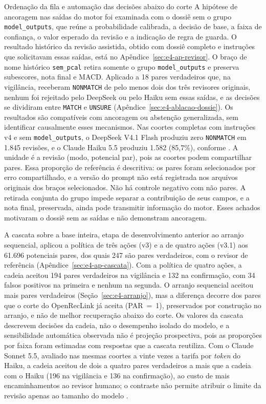 \begin{chapter}{Ordenação da fila e automação das decisões abaixo do corte}
A hipótese de ancoragem nas saídas do motor foi examinada com o dossiê sem o grupo \texttt{model\_outputs}, que reúne a probabilidade calibrada, a decisão de base, a faixa de confiança, o valor esperado da revisão e a indicação de regra de guarda. O resultado histórico da revisão assistida, obtido com dossiê completo e instruções que solicitavam essas saídas, está no Apêndice~\ref{sec:e4-ap-revisor}. O braço de nome histórico \texttt{sem\_pcal} retira somente o grupo \texttt{model\_outputs} e preserva subescores, nota final e MACD. Aplicado a 18 pares verdadeiros que, na vigilância, receberam \texttt{NONMATCH} de pelo menos dois dos três revisores originais, nenhum foi rejeitado pelo DeepSeek ou pelo Haiku sem essas saídas, e as decisões se dividiram entre \texttt{MATCH} e \texttt{UNSURE} (Apêndice~\ref{sec:e4-ablacao-dossie}). Os resultados são compatíveis com ancoragem ou abstenção generalizada, sem identificar causalmente esses mecanismos. Nas coortes completas com instruções v4 e sem \texttt{model\_outputs}, o DeepSeek V4.1 Flash produziu zero \texttt{NONMATCH} em 1.845 revisões, e o Claude Haiku 5.5 produziu 1.582 (85,7\%), conforme . A unidade é a revisão (modo, potencial par), pois as coortes podem compartilhar pares. Essa proporção de referência é descritiva: os pares foram selecionados por erro compartilhado, e a versão do prompt não está registrada nos arquivos originais dos braços selecionados. Não há controle negativo com não pares. A retirada conjunta do grupo impede separar a contribuição de seus campos, e a nota final, preservada, ainda pode transmitir informação do motor. Esses achados motivaram o dossiê sem as saídas e não demonstram ancoragem.

A cascata sobre a base inteira, etapa de desenvolvimento anterior ao arranjo sequencial, aplicou a política de três ações (v3) e a de quatro ações (v3.1) aos 61.696 potenciais pares, dos quais 247 são pares verdadeiros, com o revisor de referência (Apêndice~\ref{sec:e4-ap-cascata}). Com a política de quatro ações, a cadeia aceitou 194 pares verdadeiros na vigilância e 132 na confirmação, com 34 falsos positivos na primeira e nenhum na segunda. O arranjo sequencial aceitou mais pares verdadeiros (Seção~\ref{sec:e4-arranjo}), mas a diferença decorre dos pares que o corte do OpenRecLink já aceita (PAR~=~1), preservados por construção no arranjo, e não de melhor recuperação abaixo do corte. Os valores da cascata descrevem decisões da cadeia, não o desempenho isolado do modelo, e a sensibilidade automática observada não é projeção prospectiva, pois as proporções por faixa foram estimadas com respostas que a cascata reutiliza. Com o Claude Sonnet 5.5, avaliado nas mesmas coortes a vinte vezes a tarifa por \textit{token} do Haiku, a cadeia aceitou de dois a quatro pares verdadeiros a mais que a cadeia com o Haiku (196 na vigilância e 136 na confirmação), ao custo de mais encaminhamentos ao revisor humano; o contraste não permite atribuir o limite da revisão apenas ao tamanho do modelo \cite{Jardim2026phdrepo}.


\end{chapter}
